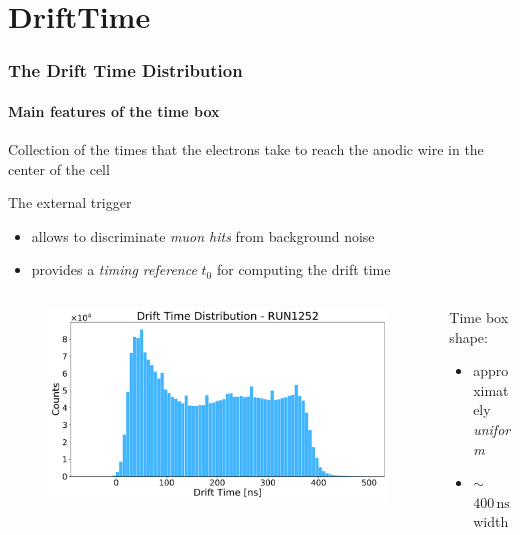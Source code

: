 \documentclass{beamer}
\begin{document}
	\section{DriftTime}
	\begin{frame}
		\frametitle{The Drift Time Distribution}
		\framesubtitle{Main features of the time box}
		\begin{alertblock}{}
			Collection of the times that the electrons take to reach the anodic wire in the center of the cell
		\end{alertblock}
		The external trigger 
		\begin{itemize}
			\item allows to discriminate \alert{\textit{muon hits}} from background noise
			\item provides a \alert{\textit{timing reference} $t_0$} for computing the drift time
		\end{itemize}

		\begin{columns}
			\begin{column}{0.5\textwidth}
				\begin{figure}
					\centering 
					\includegraphics[width=1.0\textwidth]{../PLOTS/DRIFT_TIME/thesis/run1252_shifted.pdf}
				\end{figure}
			\end{column}
			\begin{column}{0.5\textwidth}
				Time box shape:
				\begin{itemize}
					\item approximately \alert{\textit{uniform}}
					\item $\sim$\alert{$400\,\si{\nano\second}$} width
				\end{itemize}
			\end{column}
		\end{columns}
	\end{frame}
\end{document}
